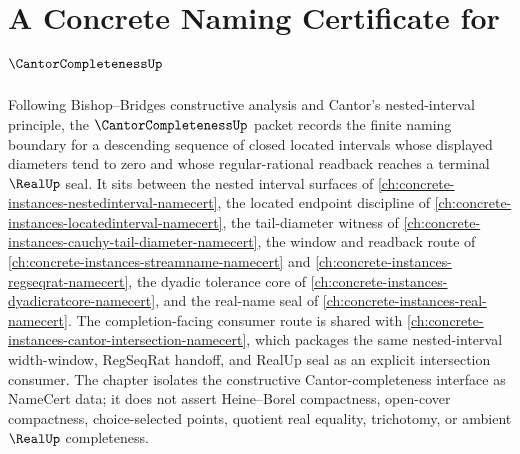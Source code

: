 \chapter{A Concrete Naming Certificate for $\CantorCompletenessUp$}
\label{ch:concrete-instances-cantor-completeness-namecert}

Following Bishop--Bridges constructive analysis and Cantor's nested-interval principle, the $\CantorCompletenessUp$ packet records the finite naming boundary for a descending sequence of closed located intervals whose displayed diameters tend to zero and whose regular-rational readback reaches a terminal $\RealUp$ seal. It sits between the nested interval surfaces of \autoref{ch:concrete-instances-nestedinterval-namecert}, the located endpoint discipline of \autoref{ch:concrete-instances-locatedinterval-namecert}, the tail-diameter witness of \autoref{ch:concrete-instances-cauchy-tail-diameter-namecert}, the window and readback route of \autoref{ch:concrete-instances-streamname-namecert} and \autoref{ch:concrete-instances-regseqrat-namecert}, the dyadic tolerance core of \autoref{ch:concrete-instances-dyadicratcore-namecert}, and the real-name seal of \autoref{ch:concrete-instances-real-namecert}. The completion-facing consumer route is shared with \autoref{ch:concrete-instances-cantor-intersection-namecert}, which packages the same nested-interval width-window, RegSeqRat handoff, and RealUp seal as an explicit intersection consumer. The chapter isolates the constructive Cantor-completeness interface as NameCert data; it does not assert Heine--Borel compactness, open-cover compactness, choice-selected points, quotient real equality, trichotomy, or ambient $\RealUp$ completeness.


